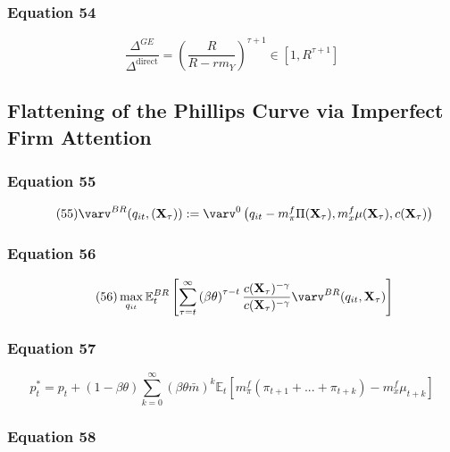 \documentclass{article}
\begin{document}
\subsubsection*{Equation 54}

\begin{equation}\tag{54}
    \frac{\Delta^{GE}}{\Delta^{\text{direct}}}=\left(\frac{R}{R-rm_{Y}}\right)^{\tau+1}\in\left[1, R^{\tau+1}\right]
\end{equation}

\subsection{Flattening of the Phillips Curve via Imperfect Firm Attention}

\subsubsection*{Equation 55}

\begin{equation}\tag{55}
    \varv^{BR}(q_{it},(\textbf{X}_{\tau})):=\varv^{0}\left(q_{it}-m^{f}_{\pi}\Pi(\textbf{X}_{\tau}),m^{f}_{x}\mu(\textbf{X}_{\tau}),c(\textbf{X}_{\tau})\right)
\end{equation}

\subsubsection*{Equation 56}

\begin{equation}\tag{56}
    \max_{q_{it}}{\mathbb{E}_{t}^{BR}\left[\sum_{\tau=t}^{\infty}\left(\beta\theta\right)^{\tau-t}\frac{c(\textbf{X}_{\tau})^{-\gamma}}{c(\textbf{X}_{\tau})^{-\gamma}}\varv^{BR}(q_{it},\textbf{X}_{\tau})\right]}
\end{equation}

\subsubsection*{Equation 57}

\begin{equation}\tag{57}
    p^{*}_{t}=p_{t}+(1-\beta\theta)\sum^{\infty}_{k=0} \left(\beta\theta\bar{m}\right)^{k}\mathbb{E}_{t}\left[m^{f}_{\pi}(\pi_{t+1}+...+\pi_{t+k})-m^{f}_{x}\mu_{t+k}\right]
\end{equation}

\subsubsection*{Equation 58}
\end{document}
